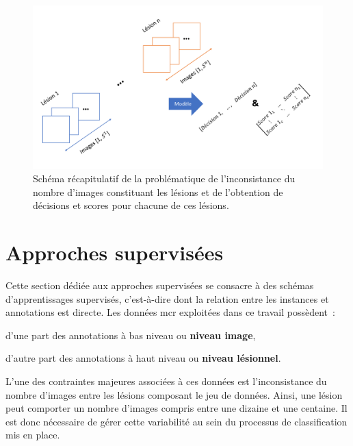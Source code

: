 \begin{figure}[H]
    \centering
    \includegraphics[width=0.65\linewidth]{contents/chapter_7/resources/scheme_patient_decision_objectives.pdf}
    \caption{Schéma récapitulatif de la problématique de l'inconsistance du nombre d'images constituant les lésions et de l'obtention de décisions et scores pour chacune de ces lésions.}
    \label{fig:scheme_patient_decision_objectives}
\end{figure}\par
\clearpage

\section{Approches supervisées}
\label{sec:patient_decision_supervised}
Cette section dédiée aux approches supervisées se consacre à des schémas d'apprentissages supervisés, c'est-à-dire dont la relation entre les instances et annotations est directe. Les données \gls{mcr} exploitées dans ce travail possèdent~:
\begin{inlinerate}
    \item d'une part des annotations à bas niveau ou \textbf{niveau image},
    \item d'autre part des annotations à haut niveau ou \textbf{niveau lésionnel}. 
\end{inlinerate} L'une des contraintes majeures associées à ces données est l'inconsistance du nombre d'images entre les lésions composant le jeu de données. Ainsi, une lésion peut comporter un nombre d'images compris entre une dizaine et une centaine. Il est donc nécessaire de gérer cette variabilité au sein du processus de classification mis en place.\par

